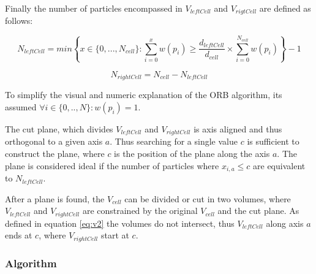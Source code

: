 \documentclass[]{article}
\begin{document}
Finally the number of particles encompassed in $V_{leftCell}$ and $V_{rigtCell}$ are defined as follows:

\begin{center}
	\begin{equation}\label{eq:N1}
		N_{leftCell} = min \left \{ x \in \{0,...,N_{cell} \} : \sum_{i=0}^{x} w(p_i) \geq \frac{d_{leftCell}}{d_{cell}} \times \sum_{i=0}^{N_{cell}} w(p_i) \right \} - 1
	\end{equation}
\end{center}

\begin{center}
	\begin{equation}\label{eq:N2}
		N_{rightCell} = N_{cell} - N_{leftCell}
	\end{equation}
\end{center}

To simplify the visual and numeric explanation of the ORB algorithm, its assumed  $\forall i \in \{0,..,N\} : w(p_i) = 1$.

The cut plane, which divides $V_{leftCell}$ and $V_{rightCell}$ is axis aligned and thus orthogonal to a given axis $a$. Thus searching for a single value $c$ is sufficient to construct the plane, where $c$ is the position of the plane along the axis $a$. The plane is considered ideal if the number of particles where $x_{i,a} \leq c$ are equivalent to $N_{leftCell}$. 

After a plane is found, the $V_{cell}$ can be divided or cut in two volumes, where $V_{leftCell}$ and $V_{rightCell}$ are constrained by the original $V_{cell}$ and the cut plane. As defined in equation \ref{eq:v2} the volumes do not intersect, thus $V_{leftCell}$ along axis $a$ ends at $c$, where $V_{rightCell}$ start at $c$.
    
  
\subsubsection{Algorithm}
\end{document}
